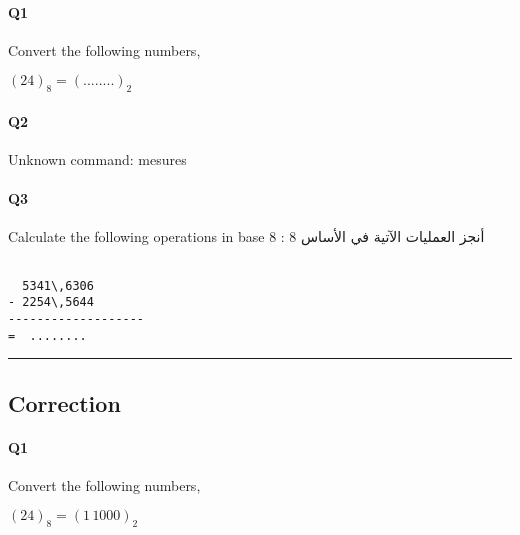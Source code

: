 \paragraph{Q1}






Convert the following numbers, \hfill{}

$(24)_{ 8 } = (........)_{ 2}$



\paragraph{Q2}

Unknown command: mesures

\paragraph{Q3}

Calculate  the following operations in base 8 :  أنجز العمليات الآتية في الأساس 8

\begin{verbatim}

  5341\,6306
- 2254\,5644
-------------------
=  ........

\end{verbatim}


\hrule width 1\linewidth
\pagebreak

\subsection{Correction}


\paragraph{Q1}






Convert the following numbers, \hfill{}

$(24)_{ 8 } = (  1\,1000)_{ 2}$



